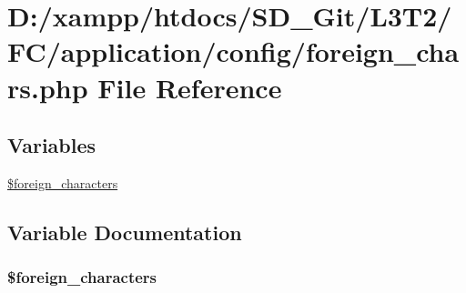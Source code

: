 \hypertarget{foreign__chars_8php}{}\section{D\+:/xampp/htdocs/\+S\+D\+\_\+\+Git/\+L3\+T2/\+F\+C/application/config/foreign\+\_\+chars.php File Reference}
\label{foreign__chars_8php}
\subsection*{Variables}
\begin{DoxyCompactItemize}
\item 
\hyperlink{foreign__chars_8php_a77bf091eac4b63b8efea27293e5ca79b}{\$foreign\+\_\+characters}
\end{DoxyCompactItemize}


\subsection{Variable Documentation}
\hypertarget{foreign__chars_8php_a77bf091eac4b63b8efea27293e5ca79b}{}
\subsubsection[{\$foreign\+\_\+characters}]{\setlength{\rightskip}{0pt plus 5cm}\$foreign\+\_\+characters}\label{foreign__chars_8php_a77bf091eac4b63b8efea27293e5ca79b}
